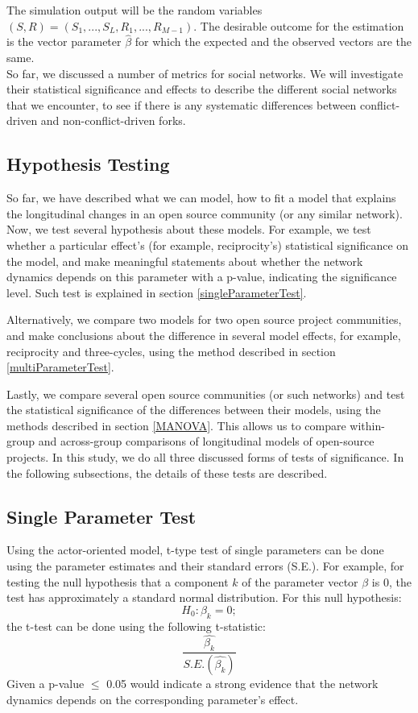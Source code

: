 \documentclass[12pt,letterpaper]{gthesis2}  %
\begin{document}
The simulation output will be the random variables $(S,R) = (S_1,...,S_L,R_1,...,R_{M-1})$. The desirable outcome for the estimation is the vector parameter $\hat{\beta}$ for which the expected and the observed vectors are the same. \\

So far, we discussed a number of metrics for social networks. We will investigate their statistical significance and effects to describe the different social networks that we encounter, to see if there is any systematic differences between conflict-driven and non-conflict-driven forks. 

\subsection*{Hypothesis Testing}
So far, we have described what we can model, how to fit a model that explains the longitudinal changes in an open source community (or any similar network). Now, we test several hypothesis about these models. For example, we test whether a particular effect's (for example, reciprocity's) statistical significance on the model, and make meaningful statements about whether the network dynamics depends on this parameter with a p-value, indicating the significance level. Such test is explained in section \ref{singleParameterTest}.

Alternatively, we compare two models for two open source project communities, and make conclusions about the difference in several model effects, for example, reciprocity and three-cycles, using the method described in section \ref{multiParameterTest}. 

Lastly, we compare several open source communities (or such networks) and test the statistical significance of the differences between their models, using the methods described in section \ref{MANOVA}. This allows us to compare within-group and across-group comparisons of longitudinal models of open-source projects. In this study, we do all three discussed forms of tests of significance. In the following subsections, the details of these tests are described.   

\subsection*{Single Parameter Test}
\label{singleParameterTest}
Using the actor-oriented model, t-type test of single parameters can be done using the parameter estimates and their standard errors (S.E.). 
For example, for testing the null hypothesis that a component $k$ of the parameter vector $\beta$ is 0, the test has approximately a standard normal distribution. For this null hypothesis: 
\begin{equation}
H_0: \beta_k = 0;
\end{equation}
the t-test can be done using the following t-statistic:
\begin{equation}
\frac{\hat{\beta_k}}{S.E.(\hat{\beta_k})}
\end{equation}
Given a p-value $\leq$ 0.05 would indicate a strong evidence that the network dynamics depends on the corresponding parameter's effect. 
\end{document}
